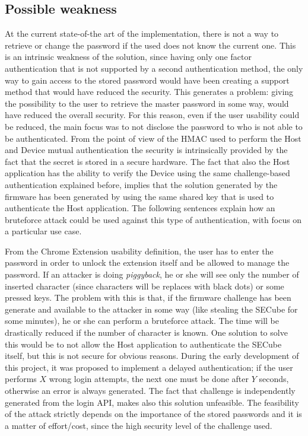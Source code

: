 \subsection{Possible weakness}
\label{sec:weakness}
At the current state-of-the art of the implementation, there is not a way to retrieve or change the password if the used does not know the current one. This is an intrinsic weakness of the solution, since having only one factor authentication that is not supported by a second authentication method, the only way to gain access to the stored password would have been creating a support method that would have reduced the security. This generates a problem: giving the possibility to the user to retrieve the master password in some way, would have reduced the overall security. For this reason, even if the user usability could be reduced, the main focus was to not disclose the password to who is not able to be authenticated.\newline\newline
From the point of view of the HMAC used to perform the Host and Device mutual authentication the security is intrinsically provided by the fact that the secret is stored in a secure hardware. The fact that also the Host application has the ability to verify the Device using the same challenge-based authentication explained before, implies that the solution generated by the firmware has been generated by using the same shared key that is used to authenticate the Host application. The following sentences explain how an bruteforce attack could be used against this type of authentication, with focus on a particular use case.

From the Chrome Extension usability definition, the user has to enter the password in order to unlock the extension itself and be allowed to manage the password. If an attacker is doing \textit{piggyback}, he or she will see only the number of inserted character (since characters will be replaces with black dots) or some pressed keys. The problem with this is that, if the firmware challenge has been generate and available to the attacker in some way (like stealing the SECube for some minutes), he or she can perform a bruteforce attack. The time will be drastically reduced if the number of character is known. One solution to solve this would be to not allow the Host application to authenticate the SECube itself, but this is not secure for obvious reasons. 
During the early development of this project, it was proposed to implement a delayed authentication; if the user performs $X$ wrong login attempts, the next one must be done after $Y$ seconds, otherwise an error is always generated. The fact that challenge is independently generated from the login API, makes also this solution unfeasible. The feasibility of the attack strictly depends on the importance of the stored passwords and it is a matter of effort/cost, since the high security level of the challenge used.


